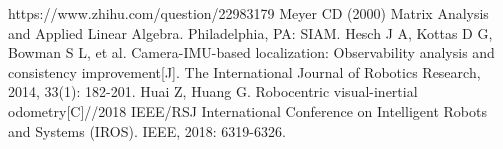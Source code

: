 \documentclass{article}
\begin{document}
\begin{thebibliography}{99}  
    https://www.zhihu.com/question/22983179
    Meyer CD (2000) Matrix Analysis and Applied Linear Algebra. Philadelphia, PA: SIAM.
     Hesch J A, Kottas D G, Bowman S L, et al. Camera-IMU-based localization: Observability analysis and consistency improvement[J]. The International Journal of Robotics Research, 2014, 33(1): 182-201.
     Huai Z, Huang G. Robocentric visual-inertial odometry[C]//2018 IEEE/RSJ International Conference on Intelligent Robots and Systems (IROS). IEEE, 2018: 6319-6326.
\end{thebibliography}
\end{document}
